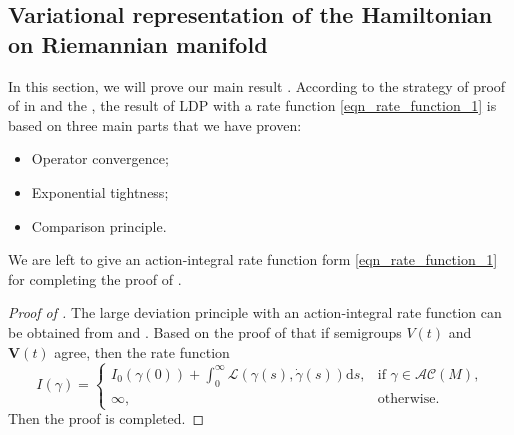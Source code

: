 \documentclass[a4paper]{article}
\numberwithin{equation}{section}
\theoremstyle{definition}
\begin{document}
\subsection{Variational representation of the Hamiltonian on Riemannian manifold }\label{se7}
 In this section, we will prove our main result . According to the strategy of proof of  in  and the , the result of LDP with a rate function \eqref{eqn_rate_function_1} is based on three main parts that we have proven:
 \begin{itemize}
     \item Operator convergence;
    \item Exponential tightness;
    \item Comparison principle.
 \end{itemize}
We are left to give an action-integral rate function form \eqref{eqn_rate_function_1} for completing the proof of .
 \begin{proof}[Proof of ]
 The large deviation principle with an action-integral rate function can be obtained from
 and . 
 Based on the proof of \cite[Theorem 8.14]{FK2006} that if semigroups $V(t)$ and $\mathbf{V}(t)$ agree, then the rate function 
  \begin{equation*}
	I(\gamma)=
	\begin{cases}
		I_0(\gamma(0))+\int^\infty_0\mathcal{L}\left(\gamma(s),\dot{\gamma}(s)\right)\mathrm{d}s,&\mbox{if~$\gamma\in\mathcal{AC}(M)$,}\\
		\infty,&\mbox{otherwise.}
	\end{cases}
\end{equation*}
  Then the proof is completed.
 \end{proof}


\appendix
\end{document}
